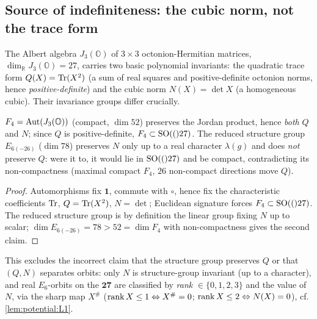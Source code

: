 \subsection{Source of indefiniteness: the cubic norm, not the trace form}
\label{sec:spacetime:norm}

The Albert algebra $J_3(\mathbb O)$ of $3\times3$ octonion-Hermitian matrices,
$\dim_{\mathbb R}J_3(\mathbb O)=27$, carries two basic polynomial invariants: the
quadratic trace form $Q(X)=\operatorname{Tr}(X^2)$ (a sum of real squares and positive-definite
octonion norms, hence \emph{positive-definite}) and the cubic norm
$N(X)=\det X$ (a homogeneous cubic). Their invariance groups differ crucially.

\begin{theorem}
\label{thm:spacetime:groups}
$F_4=\operatorname{Aut}(J_3(\mathbb O))$ (compact, $\dim 52$) preserves the Jordan product, hence
\emph{both} $Q$ and $N$; since $Q$ is positive-definite, $F_4\subset\mathrm{SO}(()27)$. The
reduced structure group $E_{6(-26)}$ ($\dim 78$) preserves $N$ only up to a real
character $\lambda(g)$ and does \emph{not} preserve $Q$: were it to, it would lie in
$\mathrm{SO}(()27)$ and be compact, contradicting its non-compactness (maximal compact $F_4$,
$26$ non-compact directions move $Q$).
\end{theorem}
\begin{proof}
Automorphisms fix $\mathbf 1$, commute with $\circ$, hence fix the characteristic
coefficients $\operatorname{Tr}$, $Q=\operatorname{Tr}(X^2)$, $N=\det$; Euclidean signature forces
$F_4\subset\mathrm{SO}(()27)$. The reduced structure group is by definition the linear group
fixing $N$ up to scalar; $\dim E_{6(-26)}=78>52=\dim F_4$ with non-compactness gives
the second claim.
\end{proof}

This excludes the incorrect claim that the structure group preserves $Q$ or that
$(Q,N)$ separates orbits: only $N$ is structure-group invariant (up to a character),
and real $E_6$-orbits on the $\mathbf{27}$ are classified by \emph{rank}
$\in\{0,1,2,3\}$ and the value of $N$, via the sharp map $X^\#$
($\operatorname{rank} X\le1\Leftrightarrow X^\#=0$; $\operatorname{rank} X\le2\Leftrightarrow N(X)=0$), cf.
\autoref{lem:potential:L1}.

